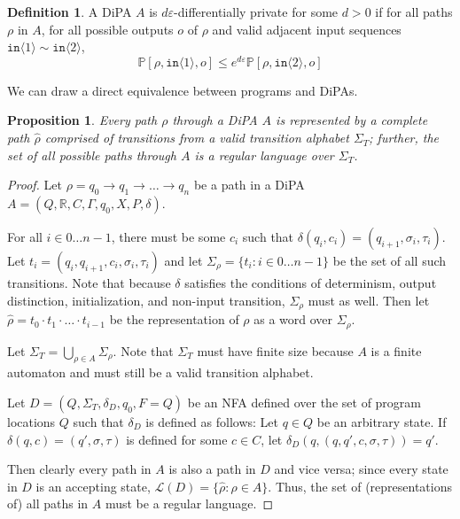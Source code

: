 \documentclass[12pt]{article}
\newcommand{\RR}{\mathbb{R}}
\newcommand{\PP}{\mathbb{P}}
\newcommand{\brangle}[1]{\langle #1 \rangle}
\newtheorem{prop}[thm]{Proposition}
\theoremstyle{definition}
\newtheorem{defn}[thm]{Definition}
\begin{document}
\begin{defn}
    A DiPA $A$ is $d\varepsilon$-differentially private for some $d>0$ if for all paths $\rho$ in $A$, for all possible outputs $o$ of $\rho$ and valid adjacent input sequences $\texttt{in}\brangle{1}\sim \texttt{in}\brangle{2}$, \[
        \PP[\rho, \texttt{in}\brangle{1}, o]\leq e^{d\varepsilon} \PP[\rho, \texttt{in}\brangle{2}, o]
    \]
\end{defn}

We can draw a direct equivalence between programs and DiPAs.

\begin{prop}
    Every path $\rho$ through a DiPA $A$ is represented by a complete path $\hat{\rho}$ comprised of transitions from a valid transition alphabet $\Sigma_T$; further, the set of all possible paths through $A$ is a regular language over $\Sigma_T$.
\end{prop}
\begin{proof}
    Let $\rho = q_0\to q_1\to\ldots \to q_n$ be a path in a DiPA $A=(Q, \RR, C, \Gamma, q_0, X, P, \delta)$. 

    For all $i\in 0\ldots n-1$, there must be some $c_i$ such that $\delta(q_i, c_i) = (q_{i+1}, \sigma_i, \tau_i)$. Let $t_i = (q_i, q_{i+1}, c_i, \sigma_i, \tau_i)$ and let $\Sigma_\rho = \{t_i: i\in 0\ldots n-1\}$ be the set of all such transitions. Note that because $\delta$ satisfies the conditions of determinism, output distinction, initialization, and non-input transition, $\Sigma_\rho$ must as well. 
    Then let $\hat{\rho} = t_0\cdot t_1\cdot \ldots\cdot t_{i-1}$ be the representation of $\rho$ as a word over $\Sigma_\rho$. 

    Let $\Sigma_T = \bigcup_{\rho\in A}\Sigma_\rho$. Note that $\Sigma_T$ must have finite size because $A$ is a finite automaton and must still be a valid transition alphabet.

    Let $D = (Q, \Sigma_T, \delta_D, q_0, F=Q)$ be an NFA defined over the set of program locations $Q$ such that $\delta_D$ is defined as follows:
    Let $q\in Q$ be an arbitrary state. If $\delta(q, c) = (q', \sigma, \tau)$ is defined for some $c\in C$, let $\delta_D(q, (q, q', c, \sigma, \tau)) = q'$.

    Then clearly every path in $A$ is also a path in $D$ and vice versa; since every state in $D$ is an accepting state, $\mathcal{L}(D) = \{\hat{\rho}: \rho\in A\}$. Thus, the set of (representations of) all paths in $A$ must be a regular language. 
\end{proof}
\end{document}

